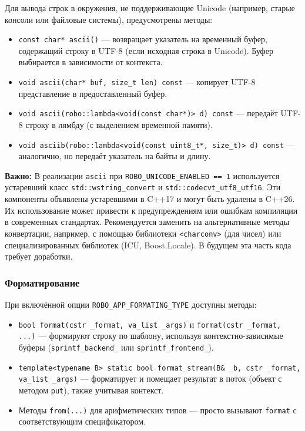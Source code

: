 \documentclass[a4paper,12pt]{article}
\begin{document}
Для вывода строк в окружения, не поддерживающие Unicode (например, старые консоли или файловые системы), предусмотрены методы:

\begin{itemize}
    \item \texttt{const char* ascii()} — возвращает указатель на временный буфер, содержащий строку в UTF-8 (если исходная строка в Unicode). Буфер выбирается в зависимости от контекста.
    \item \texttt{void ascii(char* buf, size\_t len) const} — копирует UTF-8 представление в предоставленный буфер.
    \item \texttt{void ascii(robo::lambda<void(const char*)> d) const} — передаёт UTF-8 строку в лямбду (с выделением временной памяти).
    \item \texttt{void asciib(robo::lambda<void(const uint8\_t*, size\_t)> d) const} — аналогично, но передаёт указатель на байты и длину.
\end{itemize}

\textbf{Важно:} В реализации \texttt{ascii} при \texttt{ROBO\_UNICODE\_ENABLED == 1} используется устаревший класс \texttt{std::wstring\_convert} и \texttt{std::codecvt\_utf8\_utf16}. Эти компоненты объявлены устаревшими в C++17 и могут быть удалены в C++26. Их использование может привести к предупреждениям или ошибкам компиляции в современных стандартах. Рекомендуется заменить на альтернативные методы конвертации, например, с помощью библиотеки \texttt{<charconv>} (для чисел) или специализированных библиотек (ICU, Boost.Locale). В будущем эта часть кода требует доработки.

\subsubsection{Форматирование}

При включённой опции \texttt{ROBO\_APP\_FORMATING\_TYPE} доступны методы:

\begin{itemize}
    \item \texttt{bool format(cstr \_format, va\_list \_args)} и \texttt{format(cstr \_format, ...)} — формируют строку по шаблону, используя контекстно-зависимые буферы (\texttt{sprintf\_backend\_} или \texttt{sprintf\_frontend\_}).
    \item \texttt{template<typename B> static bool format\_stream(B\& \_b, cstr \_format, va\_list \_args)} — форматирует и помещает результат в поток (объект с методом \texttt{put}), также учитывая контекст.
    \item Методы \texttt{from(...)} для арифметических типов — просто вызывают \texttt{format} с соответствующим спецификатором.
\end{itemize}
\end{document}
